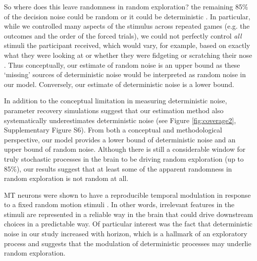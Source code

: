 \documentclass[12pt]{article}
\begin{document}
		
		So where does this leave randomness in random exploration?  the remaining 85\% of the decision noise could be random or it could be deterministic . In particular, while we controlled many aspects of the stimulus across repeated games (e.g. the outcomes and the order of the forced trials), we could not perfectly control {\it all} stimuli the participant received, which would vary, for example, based on exactly what they were looking at or whether they were fidgeting or scratching their nose \citep{Musall2019}. Thus conceptually, our estimate of random noise is an upper bound as these `missing' sources of deterministic noise would be interpreted as random noise in our model. Conversely, our estimate of deterministic noise is a lower bound. 
		
		In addition to the conceptual limitation in measuring deterministic noise, parameter recovery simulations suggest that our estimation method also systematically underestimates deterministic noise (see Figure \ref{fig:coverage2}, Supplementary Figure S6). From both a conceptual and methodological perspective, our model provides a lower bound of deterministic noise and an upper bound of random noise. Although there is still a considerable window for truly stochastic processes in the brain to be driving random exploration (up to 85\%), our results suggest that at least some of the apparent randomness in random exploration is not random at all. 
		
		MT neurons were shown to have a reproducible temporal modulation in response to a fixed random motion stimuli \citep{Bair1996}. In other words, irrelevant features in the stimuli are represented in a reliable way in the brain that could drive downstream choices in a predictable way. Of particular interest was the fact that deterministic noise in our study increased with horizon, which is a hallmark of an exploratory process and suggests that the modulation of deterministic processes may underlie random exploration. 
		
\end{document}
